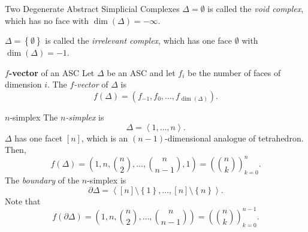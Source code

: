 \documentclass[co439]{subfiles}
\begin{document}
    \begin{example}{Two Degenerate Abstract Simplicial Complexes}
        $\Delta=\emptyset$ is called the \emph{void complex}, which has no face with $\dim\left( \Delta \right) = -\infty$.

        $\Delta = \left\lbrace \emptyset \right\rbrace$ is called the \emph{irrelevant complex}, which has one face $\emptyset$ with $\dim\left( \Delta \right)=-1$.
    \end{example}

    \rruleline

    \begin{definition}{\textbf{$f$-vector} of an ASC}
        Let $\Delta$ be an ASC and let $f_i$ be the number of faces of dimension $i$. The \emph{$f$-vector} of $\Delta$ is
        \begin{equation*}
            f\left( \Delta \right) = \left( f_{-1},f_0,\ldots,f_{\dim\left( \Delta \right)} \right).
        \end{equation*}
    \end{definition}
    
    \begin{example}{$n$-simplex}
        The \emph{$n$-simplex} is
        \begin{equation*}
            \Delta = \left< 1,\ldots,n \right>. 
        \end{equation*}
        $\Delta$ has one facet $\left[ n \right]$, which is an $(n-1)$-dimensional analogue of tetrahedron. Then,
        \begin{equation*}
            f\left( \Delta \right) = \left( 1,n,\binom{n}{2},\ldots,\binom{n}{n-1},1 \right) = \left( \binom{n}{k} \right)^{n}_{k=0}.
        \end{equation*}
        The \emph{boundary} of the $n$-simplex is
        \begin{equation*}
            \partial\Delta = \left< \left[ n \right] \setminus \left\lbrace 1 \right\rbrace, \ldots, \left[ n \right]\setminus \left\lbrace n \right\rbrace \right> .
        \end{equation*}
        Note that
        \begin{equation*}
            f\left( \partial\Delta \right) = \left( 1,n,\binom{n}{2},\ldots,\binom{n}{n-1} \right) = \left( \binom{n}{k} \right)^{n-1}_{k=0}.
        \end{equation*}
    \end{example}

    \rruleline
\end{document}
